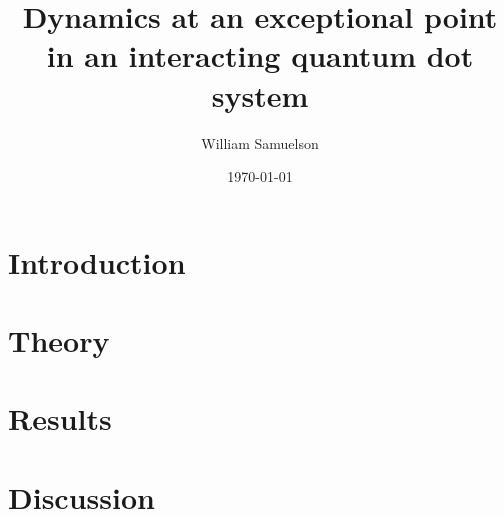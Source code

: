\documentclass{article}
\begin{document}
%
\title{Dynamics at an exceptional point in an interacting quantum dot system}
\author{William Samuelson}
\date{\today}
\maketitle
\newpage
\tableofcontents
\newpage
\section{Introduction}

\section{Theory}

\section{Results}

\section{Discussion}


\newpage
\printbibliography
\end{document}
